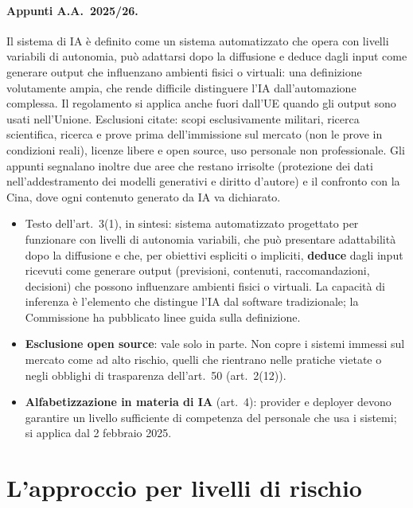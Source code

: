 \paragraph{Appunti A.A.~2025/26.} Il sistema di IA è definito come un sistema automatizzato che opera
con livelli variabili di autonomia, può adattarsi dopo la diffusione e deduce dagli input come generare
output che influenzano ambienti fisici o virtuali: una definizione volutamente ampia, che rende difficile
distinguere l'IA dall'automazione complessa. Il regolamento si applica anche fuori dall'UE quando gli
output sono usati nell'Unione. Esclusioni citate: scopi esclusivamente militari, ricerca scientifica,
ricerca e prove prima dell'immissione sul mercato (non le prove in condizioni reali), licenze libere e
open source, uso personale non professionale. Gli appunti segnalano inoltre due aree che restano
irrisolte (protezione dei dati nell'addestramento dei modelli generativi e diritto d'autore) e il
confronto con la Cina, dove ogni contenuto generato da IA va dichiarato.

\begin{integrazione}
\begin{itemize}
  \item Testo dell'art.~3(1), in sintesi: sistema automatizzato progettato per funzionare con livelli
    di autonomia variabili, che può presentare adattabilità dopo la diffusione e che, per obiettivi
    espliciti o impliciti, \textbf{deduce} dagli input ricevuti come generare output (previsioni,
    contenuti, raccomandazioni, decisioni) che possono influenzare ambienti fisici o virtuali. La
    capacità di inferenza è l'elemento che distingue l'IA dal software tradizionale; la Commissione ha
    pubblicato linee guida sulla definizione.
  \item \textbf{Esclusione open source}: vale solo in parte. Non copre i sistemi immessi sul mercato
    come ad alto rischio, quelli che rientrano nelle pratiche vietate o negli obblighi di trasparenza
    dell'art.~50 (art.~2(12)).
  \item \textbf{Alfabetizzazione in materia di IA} (art.~4): provider e deployer devono garantire un
    livello sufficiente di competenza del personale che usa i sistemi; si applica dal 2 febbraio 2025.
\end{itemize}
\end{integrazione}

\section{L'approccio per livelli di rischio}
\label{sec:aiact-rischio}


